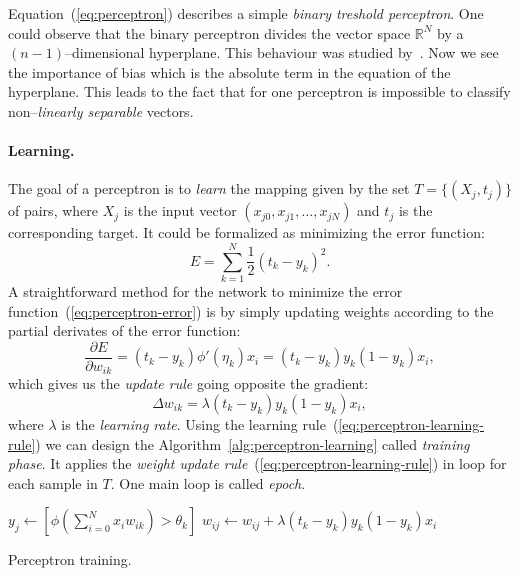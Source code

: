 Equation~(\ref{eq:perceptron}) describes a simple \emph{binary treshold perceptron}. One could observe that the binary perceptron divides the vector space $\mathbb{R}^N$ by a $(n-1)$--dimensional hyperplane. This behaviour was studied by~\citet{rosenblatt1958perceptron}. Now we see the importance of bias which is the absolute term in the equation of the hyperplane. \label{sec:linear-sep} This leads to the fact that for one perceptron is impossible to classify non--\emph{linearly separable} vectors. 

\paragraph{Learning.} 
The goal of a perceptron is to \emph{learn} the mapping given by the set $T = \{(X_j, t_j)\}$ of pairs, where $X_j$ is the input vector $(x_{j0},x_{j1}, \ldots, x_{jN})$ and $t_j$ is the corresponding target. It could be formalized as minimizing the error function: 
\begin{equation}
\label{eq:perceptron-error} 
E = \sum_{k=1}^{N} \frac{1}{2}(t_k-y_k)^2.
\end{equation} 
A straightforward method for the network to minimize the error function~(\ref{eq:perceptron-error}) is by simply updating weights according to the partial derivates of the error function: 
\begin{equation}
\label{eq:perceptron-learning} 
\frac{\partial E}{\partial w_{ik}} = (t_k - y_k)\phi'(\eta_k)x_i = (t_k - y_k)y_k(1 - y_k)x_i,
\end{equation} 
which gives us the \emph{update rule} going opposite the gradient: 
\begin{equation} 
\label{eq:perceptron-learning-rule} 
\Delta w_{ik} = \lambda (t_k - y_k)y_k(1 - y_k)x_i,
\end{equation} 
where $\lambda$ is the \emph{learning rate}. Using the learning rule~(\ref{eq:perceptron-learning-rule}) we can design the Algorithm~\ref{alg:perceptron-learning} called \emph{training phase}. It applies the \emph{weight update rule}~(\ref{eq:perceptron-learning-rule}) in loop for each sample in $T$. One main loop is called \emph{epoch}.

\begin{algorithm}[h]
  \begin{algorithmic}
        \State $y_j \gets [\phi(\sum_{i=0}^N x_iw_{ik}) > \theta_k]$
          \State $w_{ij} \gets w_{ij} + \lambda (t_k - y_k)y_k(1 - y_k)x_i$
        \EndFor
      \EndFor
    \EndFor
  \end{algorithmic}
  \caption{Perceptron training.}  
  \label{alg:perceptron-learning}
\end{algorithm} 

